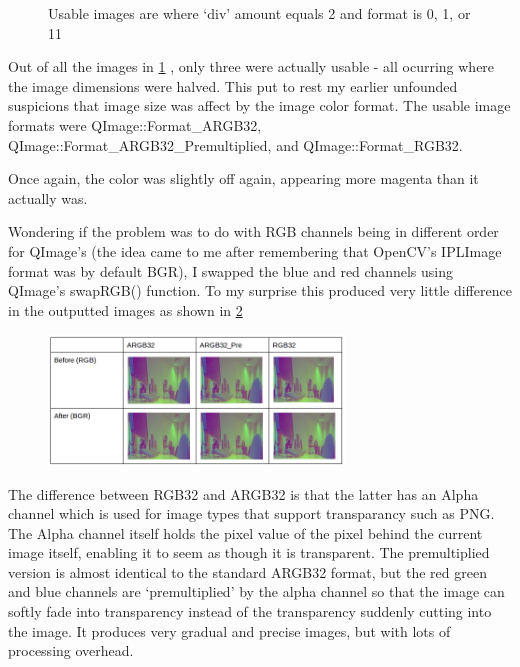 {{\begin{figure}
\begin{center}
	\end{center}
	\vspace{-20pt}
	\caption{Usable images are where ‘div’ amount equals 2 and format is 0, 1, or 11}
	\label{fig:shell2}
\end{figure}
Out of all the images in \cref{fig:shell2} , only three were actually usable - all ocurring where the image dimensions were halved. This put to rest my earlier unfounded suspicions that image size was affect by the image color format. The usable image formats were QImage::Format\_ARGB32, QImage::Format\_ARGB32\_Premultiplied, and QImage::Format\_RGB32.

Once again, the color was slightly off again, appearing more magenta than it actually was.

Wondering if the problem was to do with RGB channels being in different order for QImage’s (the idea came to me after remembering that OpenCV’s IPLImage format was by default BGR), I swapped the blue and red channels using QImage’s swapRGB() function. To my surprise this produced very little difference in the outputted images as shown in \cref{fig:swaprgb}
\begin{figure}
	\begin{center}
		\includegraphics[width=0.7\textwidth]{../images/qpix/swaprgb}
	\end{center}
	\vspace{-20pt}
	\caption{}
	\label{fig:swaprgb}
\end{figure}

 The difference between RGB32 and ARGB32 is that the latter has an Alpha channel which is used for image types that support transparancy such as PNG. The Alpha channel itself holds the pixel value of the pixel behind the current image itself, enabling it to seem as though it is transparent.  The premultiplied version is almost identical to the standard ARGB32 format, but the red green and blue channels are ‘premultiplied’ by the alpha channel so that the image can softly fade into transparency instead of the transparency suddenly cutting into the image. It produces very gradual and precise images, but with lots of processing overhead.

}}
